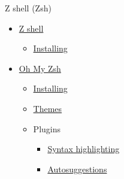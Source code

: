 \documentclass{beamer}
\begin{document}
    \begin{frame}{Z shell (Zsh)}
        \begin{itemize}
            \item\href{https://en.wikipedia.org/wiki/Z_shell}{Z shell}
            \begin{itemize}
                \item\href{https://github.com/ohmyzsh/ohmyzsh/wiki/Installing-ZSH}{Installing}
            \end{itemize}
            \item\href{https://ohmyz.sh/}{Oh My Zsh}
            \begin{itemize}
                \item\href{https://ohmyz.sh/\#install}{Installing}
                \item\href{https://github.com/ohmyzsh/ohmyzsh/wiki/Themes}{Themes}
                \item Plugins
                \begin{itemize}
                    \item\href{https://github.com/zsh-users/zsh-syntax-highlighting/blob/master/INSTALL.md}{Syntax highlighting}
                    \item\href{https://github.com/zsh-users/zsh-autosuggestions/blob/master/INSTALL.md\#oh-my-zsh}{Autosuggestions}
                \end{itemize}
            \end{itemize}
        \end{itemize}
    \end{frame}
\end{document}
